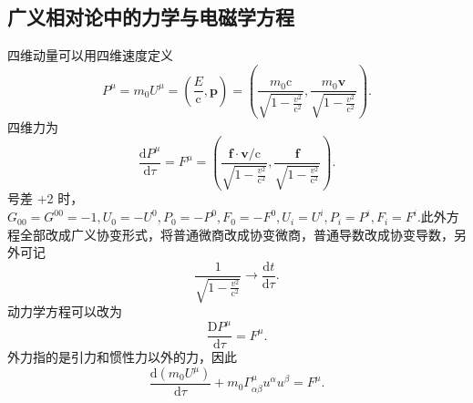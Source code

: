 \documentclass[11pt, a4paper, oneside, onecolumn]{ctexart}
\numberwithin{equation}{subsection}
\begin{document}
\subsection{广义相对论中的力学与电磁学方程}
四维动量可以用四维速度定义
\begin{equation}
P^{\mu}=m_{0}U^{\mu}=\left(\frac{E}{\mathrm{c}},\boldsymbol{p}\right)=\left(\frac{m_{0}\mathrm{c}}{\sqrt{1-\frac{v^{2}}{\mathrm{c}^{2}}}},\frac{m_{0}\boldsymbol{v}}{\sqrt{1-\frac{v^{2}}{\mathrm{c}^{2}}}}\right).
\end{equation}
四维力为
\begin{equation}
\frac{\mathrm{d}P^{\mu}}{\mathrm{d}\tau}=F^{\mu}=\left(\frac{\boldsymbol{f}\cdot\boldsymbol{v}/\mathrm{c}}{\sqrt{1-\frac{v^{2}}{\mathrm{c}^{2}}}},\frac{\boldsymbol{f}}{\sqrt{1-\frac{v^{2}}{\mathrm{c}^{2}}}}\right).
\end{equation}
号差 +2 时，$G_{00}=G^{00}=-1,U_{0}=-U^{0},P_{0}=-P^{0},F_{0}=-F^{0},U_{i}=U^{i},P_{i}=P^{i},F_{i}=F^{i}$.此外方程全部改成广义协变形式，将普通微商改成协变微商，普通导数改成协变导数，另外可记
\begin{equation}
\frac{1}{\sqrt{1-\frac{v^{2}}{\mathrm{c}^{2}}}}\to\frac{\mathrm{d}t}{\mathrm{d}\tau}.
\end{equation}
动力学方程可以改为
\begin{equation}
\frac{\mathrm{D}P^{\mu}}{\mathrm{d}\tau}=F^{\mu}.
\end{equation}
外力指的是引力和惯性力以外的力，因此
\begin{equation}
\frac{\mathrm{d}\left(m_{0}U^{\mu}\right)}{\mathrm{d}\tau}+m_{0}\Gamma_{\alpha\beta}^{\mu}u^{\alpha}u^{\beta}=F^{\mu}.
\end{equation}
\end{document}
